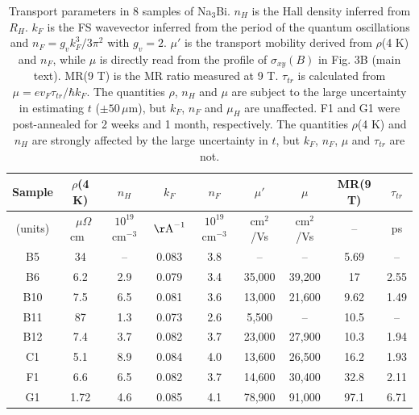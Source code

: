 \begin{table}[!htbp]
  \begin{center}
\begin{tabular}{|c|c|c|c|c|c|c|c|c|} \hline
Sample	& $\rho$(4 K)       & $n_H$	& $k_F$ &     $n_F$       &  $\mu'$    &     $\mu$  & MR(9 T)  & $\tau_{tr}$ \\ \hline
(units)   & $\;\;\mu\Omega$cm$\;\;$ & $10^{19}$ cm$^{-3}$  &  $\rm{\AA}^{-1}$    &   $10^{19}$ cm$^{-3}$      &  cm$^2$/Vs      & cm$^2$/Vs  & --  & ps \\ \hline\hline
B5		  &	34         &			  --      &	  0.083		 &  3.8      &     	--    &   --		         &    5.69   &   -- \\ \hline
B6		  &  6.2		        &   2.9		&   0.079		 &  	3.4     &		35,000    &   39,200    &  17     &   2.55 \\ \hline
B10	  &  7.5				   &  6.5				& 	0.081      &		3.6    &    13,000    &  	21,600  & 9.62   &  1.49  \\ \hline
B11	  &  87        &  1.3				&  0.073			&  	2.6 			&  5,500        &     --        &  10.5  &  --  \\ \hline
B12	  &  7.4        &  3.7				&  0.082			&  	3.7 			&  23,000        &  27,900  &    10.3 &  1.94 \\ \hline
C1			&  5.1					&  8.9				&  0.084			&   4.0			&  13,600      &   26,500    & 16.2  &  1.93  \\ \hline
F1	      &  6.6         &  6.5         &  0.082     &   3.7     &   14,600     &   30,400   &  32.8  &  2.11  \\  \hline
G1			&  1.72					&  4.6					&  0.085		&   4.1			&  78,900	   &   91,000   & 97.1   &   6.71 \\ \hline
\end{tabular}
\caption{\label{tab}
Transport parameters in 8 samples of Na$_3$Bi. $n_H$ is the Hall density inferred from $R_H$. $k_F$ is the FS wavevector inferred from the period of the quantum oscillations and $n_F = g_vk_F^3/3\pi^2$ with $g_v =2$. $\mu'$ is the transport mobility derived from $\rho$(4 K) and $n_F$, while $\mu$ is directly read from the profile of $\sigma_{xy}(B)$ in Fig. 3B (main text). MR(9 T) is the MR ratio measured at 9 T. $\tau_{tr}$ is calculated from $\mu = ev_F\tau_{tr}/\hbar k_F$. The quantities $\rho$, $n_H$ and $\mu$ are subject to the large uncertainty in estimating $t$ ($\pm 50\,\mu$m), but $k_F$, $n_F$ and $\mu_H$ are unaffected. F1 and G1 were post-annealed for 2 weeks and 1 month, respectively. The quantities $\rho$(4 K) and $n_H$ are strongly affected by the large uncertainty in $t$, but $k_F$, $n_F$, $\mu$ and $\tau_{tr}$ are not.
}
  \end{center}
\end{table}
